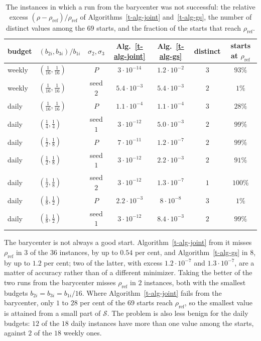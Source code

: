 \documentclass[11pt]{article}
\theoremstyle{plain}
\theoremstyle{remark}
\numberwithin{equation}{section}
\begin{document}
\begin{table}[ht]
\centering
\small
\begin{tabular}{llccccc}
\hline
budget & $(b_{2i},b_{3i})/b_{1i}$ & $\sigma_2,\sigma_3$ &
Alg.~\ref{t-alg-joint} & Alg.~\ref{t-alg-gs} & distinct & starts at $\rho_{\mathrm{ref}}$\\
\hline
weekly & $(\tfrac1{16},\tfrac1{16})$ & $P$       & $3\cdot 10^{-14}$ & $1.2\cdot 10^{-2}$ & $3$ & $93\%$\\
weekly & $(\tfrac1{16},\tfrac1{16})$ & seed $2$  & $5.4\cdot 10^{-3}$ & $5.4\cdot 10^{-3}$ & $2$ & $1\%$\\
daily  & $(\tfrac1{16},\tfrac1{16})$ & $P$       & $1.1\cdot 10^{-4}$ & $1.1\cdot 10^{-4}$ & $3$ & $28\%$\\
daily  & $(\tfrac14,\tfrac14)$       & seed $1$  & $3\cdot 10^{-12}$ & $5.0\cdot 10^{-3}$ & $2$ & $99\%$\\
daily  & $(\tfrac12,\tfrac18)$       & $P$       & $7\cdot 10^{-11}$ & $1.2\cdot 10^{-7}$ & $2$ & $99\%$\\
daily  & $(\tfrac12,\tfrac18)$       & seed $1$  & $3\cdot 10^{-12}$ & $2.2\cdot 10^{-3}$ & $2$ & $91\%$\\
daily  & $(\tfrac12,\tfrac18)$       & seed $2$  & $3\cdot 10^{-12}$ & $1.3\cdot 10^{-7}$ & $1$ & $100\%$\\
daily  & $(\tfrac18,\tfrac12)$       & $P$       & $2.2\cdot 10^{-3}$ & $8\cdot 10^{-8}$ & $3$ & $1\%$\\
daily  & $(\tfrac18,\tfrac12)$       & seed $1$  & $3\cdot 10^{-12}$ & $8.4\cdot 10^{-3}$ & $2$ & $99\%$\\
\hline
\end{tabular}
\caption{The instances in which a run from the barycenter was not successful:
the relative excess $(\rho-\rho_{\mathrm{ref}})/\rho_{\mathrm{ref}}$ of
Algorithms~\ref{t-alg-joint} and~\ref{t-alg-gs}, the number of distinct values
among the $69$ starts, and the fraction of the starts that reach
$\rho_{\mathrm{ref}}$.}\label{t-tab-fail}
\end{table}

The barycenter is not always a good start. Algorithm~\ref{t-alg-joint} from it
misses $\rho_{\mathrm{ref}}$ in $3$ of the $36$ instances, by up to $0.54$ per
cent, and Algorithm~\ref{t-alg-gs} in $8$, by up to $1.2$ per cent; two of the
latter, with excess $1.2\cdot 10^{-7}$ and $1.3\cdot 10^{-7}$, are a matter of
accuracy rather than of a different minimizer. Taking the better of the two
runs from the barycenter misses $\rho_{\mathrm{ref}}$ in $2$ instances, both
with the smallest budgets $b_{2i}=b_{3i}=b_{1i}/16$. Where Algorithm~\ref{t-alg-joint} fails from the
barycenter, only $1$ to $28$ per cent of the $69$ starts reach
$\rho_{\mathrm{ref}}$, so the smallest value is attained from a small part of
$\mathcal{S}$. The problem is also less benign for the daily budgets: $12$ of
the $18$ daily instances have more than one value among the starts, against
$2$ of the $18$ weekly ones.
\end{document}
